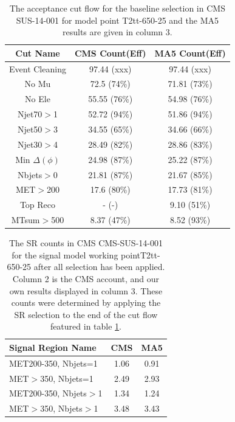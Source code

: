 \begin{table}
    \centering
    \caption{The acceptance cut flow for the baseline selection in CMS SUS-14-001 for
    model point T2tt-650-25 and the MA5 results are given in column 3.}
    \begin{tabular}{  c | c | c  }
    \hline
    Cut Name & CMS Count(Eff) & MA5 Count(Eff)\\
    \hline
        Event Cleaning & 97.44 (xxx) & 97.44 (xxx)\\
    No Mu & 72.5 (74\%) & 71.81 (73\%)\\
    No Ele & 55.55 (76\%) & 54.98 (76\%)\\
    Njet70$>$1 & 52.72 (94\%) & 51.86 (94\%)\\
    Njet50$>$3 & 34.55 (65\%) & 34.66 (66\%)\\
    Njet30$>$4 & 28.49 (82\%) & 28.86 (83\%)\\
    Min $\Delta(\phi)$ & 24.98 (87\%) & 25.22 (87\%)\\
    Nbjets$>$0 & 21.81 (87\%) & 21.67 (85\%)\\
    MET$>$200 & 17.6 (80\%) & 17.73 (81\%)\\
    Top Reco & - (-) & 9.10 (51\%)\\
    MTsum$>$500 & 8.37 (47\%) & 8.52 (93\%)\\
\hline
    \end{tabular}
    \label{table:T2tt-650-25}
    
    \end{table}

    \begin{table}
    \centering
    \caption{The SR counts in CMS CMS-SUS-14-001 for
    the signal model working pointT2tt-650-25 after all selection has been applied. Column 2 is the CMS account,
    and our own results displayed in column 3. These counts were determined by applying the SR selection to the end of the cut flow featured in table \ref{table:T2tt-650-25}.}
    \begin{tabular}{  l | c | c  }
    \hline
    Signal Region Name & CMS & MA5\\
    \hline
    MET200-350,  Nbjets=1 & 1.06 & 0.91\\ 
 \hline 
MET$>$350,  Nbjets=1 & 2.49 & 2.93\\ 
 \hline 
MET200-350,  Nbjets$>$1 & 1.34 & 1.24\\ 
 \hline 
MET$>$350,  Nbjets$>$1 & 3.48 & 3.43\\ 
 \hline 
\hline
    \end{tabular}
    
    \end{table}


